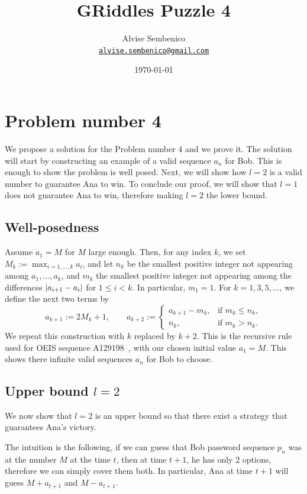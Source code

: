 \documentclass[11pt,a4paper]{article}
\title{GRiddles Puzzle 4}
\author{Alvise Sembenico\\\small\href{mailto:alvise.sembenico@gmail.com}{\texttt{alvise.sembenico@gmail.com}}}
\date{\today}
\theoremstyle{definition}
\theoremstyle{remark}
\numberwithin{equation}{section}
\DeclarePairedDelimiter{\abs}{\lvert}{\rvert}
\begin{document}
\maketitle

\section{Problem number 4}
We propose a solution for the Problem number 4 and we prove it. 
The solution will start by constructing an example of a valid sequence $a_n$ for Bob. This is enough to show the problem is well posed. Next, we will show how $l=2$ is a valid number to guarantee Ana to win. To conclude our proof, we will show that $l=1$ does not guarantee Ana to win, therefore making $l=2$ the lower bound.


\subsection{Well-posedness}
Assume $a_1=M$ for $M$ large enough. Then, for any index $k$, we set
$M_k:=\max_{i=1,\ldots,k}a_i$, and let $n_k$ be the smallest positive
integer not appearing among $a_1,\ldots,a_k$, and $m_k$ the smallest positive
integer not appearing among the differences
$\abs{a_{i+1}-a_i}$ for $1\leq i<k$. In particular, $m_1=1$.
For $k=1,3,5,\ldots$, we define the next two terms by 
\begin{equation}\label{eq:sequence-recursion}
  a_{k+1}:=2M_k+1,
  \qquad
  a_{k+2}:=
  \begin{cases}
    a_{k+1}-m_k, & \text{if }m_k\leq n_k,\\
    n_k, & \text{if }m_k>n_k.
  \end{cases}
\end{equation}
We repeat this construction with $k$ replaced by $k+2$.
This is the recursive rule used for OEIS sequence A129198~\cite{oeis-a129198},
with our chosen initial value $a_1=M$. This shows there infinite valid sequences $a_n$ for Bob to choose. 

\subsection{Upper bound $l=2$}
We now show that $l=2$ is an upper bound so that there exist a strategy that guarantees Ana's victory. 

The intuition is the following, if we can guess that Bob password sequence $p_n$ was at the number $M$ at the time $t$, then at time $t+1$, he has only 2 options, therefore we can simply cover them both. In particular, Ana at time $t+1$ will guess $M+a_{t+1}$ and $M-a_{t+1}$. 
\end{document}

